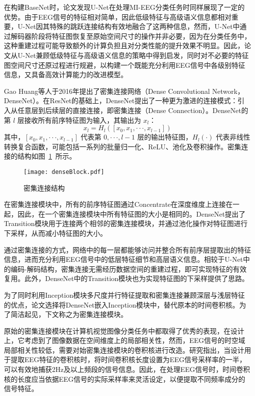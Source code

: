 在构建BaseNet时，论文发现U-Net在处理MI-EEG分类任务时同样展现了一定的优势。由于EEG信号的特征相对简单，因此低级特征与高级语义信息都相对重要，U-Net因其特殊的跳跃连接结构有效地融合了这两种信息，然而，U-Net中通过解码器阶段将特征图恢复至原始空间尺寸的操作并非必要，因为在分类任务中，这种重建过程可能导致额外的计算负担且对分类性能的提升效果不明显。因此，论文从U-Net兼顾低级特征与高级语义信息的策略中得到启发，同时对不必要的特征图空间尺寸还原过程进行规避，以构建一个既能充分利用EEG信号中各级别特征信息，又具备高效计算能力的改进模型。

Gao Huang等人于2016年提出了密集连接网络\cite{huang2017densely}（Dense Convolutional Network，DenseNet）。在ResNet的基础上，DenseNet提出了一种更为激进的连接模式：引入从任意层到后续层的直接连接，即密集连接（Dense Connection）。DenseNet的第 \(l\) 层接收所有前序特征图为输入，其输出为 \(x_l\)：
\begin{equation}
  x_l = H_l([x_0, x_1, ···, x_{l-1}])
  \label{eq:dense-conn}
\end{equation}
其中，\([x_0, x_1, ···, x_{l-1}]\) 代表第 \(0, ···, l-1\) 层的输出特征图，\(H_l(·)\) 代表非线性转换复合函数，可能包括一系列的批量归一化、ReLU、池化及卷积操作。密集连接的结构如图~\ref{fig:denseBlock}~所示。
\begin{figure}
  \centering
  \texttt{[image: denseBlock.pdf]}
  \caption{密集连接结构}
  \label{fig:denseBlock}
\end{figure}

在密集连接模块中，所有的前序特征图通过Concentrate在深度维度上连接在一起，因此，在一个密集连接模块中所有特征图的大小是相同的。DenseNet提出了Transition模块用于连接两个相邻的密集连接模块，并通过池化操作对特征图进行下采样，从而减小特征图的大小。

通过密集连接的方式，网络中的每一层都能够访问并整合所有前序层提取出的特征信息，进而充分利用EEG信号中的低层特征细节和高层语义信息。相较于U-Net中的编码-解码结构，密集连接无需经历数据空间的重建过程，即可实现特征的有效复用。此外，DenseNet中的Transition模块也为实现特征图的下采样提供了思路。

为了同时利用Inception模块多尺度并行特征提取和密集连接兼顾深层与浅层特征的优点，论文选择将DenseNet嵌入Inception模块中，替代原本的时间卷积核。为了简洁起见，下文称之为密集连接模块。

原始的密集连接模块在计算机视觉图像分类任务中都取得了优秀的表现，在设计上，它考虑到了图像数据在空间维度上的局部相关性，然而，EEG信号的时空域局部相关性较低，需要对始密集连接模块的卷积核进行改造。研究指出\cite{lawhern2018eegnet}，当设计用于提取EEG特征的卷积核时，将时间卷积核长度设置为EEG信号采样率的一半，可以有效地捕获2Hz及以上频段的信号信息。因此，在处理EEG信号时，时间卷积核的长度应当依据EEG信号的实际采样率来灵活设定，以便提取不同频率成分的信号特征。

